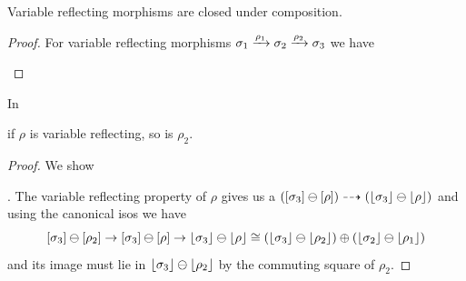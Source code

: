 \begin{lemma}\label{lem:comp-vrefl}
    Variable reflecting morphisms are closed under composition.
\end{lemma}
\begin{proof}
    For variable reflecting morphisms $\sigma_1 \xrightarrow{\rho_1} \sigma_2 \xrightarrow{\rho_2} \sigma_3$ we have
    \begin{center}
    \end{center}\vspace{-1.5\baselineskip}
\end{proof}

\begin{lemma}\label{lem:vrefl-cancl}
    In 
    if $\rho$ is variable reflecting, so is $\rho_2$.
\end{lemma}
\begin{proof}
    We show
    .
    The variable reflecting property of $\rho$ gives us a $([\sigma_3] \ominus [\rho]) \dashrightarrow (\lfloor\sigma_3\rfloor \ominus \lfloor\rho\rfloor)$
    and using the canonical isos we have
    \[ [\sigma_3] \ominus [\rho_2] \to 
       [\sigma_3] \ominus [\rho]     \to 
       \lfloor\sigma_3\rfloor \ominus \lfloor\rho\rfloor   \cong 
       (\lfloor\sigma_3\rfloor \ominus \lfloor\rho_2\rfloor) \oplus (\lfloor\sigma_2\rfloor \ominus \lfloor\rho_1\rfloor) \] 
    and its image must lie in $\lfloor\sigma_3\rfloor \ominus \lfloor\rho_2\rfloor$ by the commuting square of $\rho_2$.
\end{proof}

